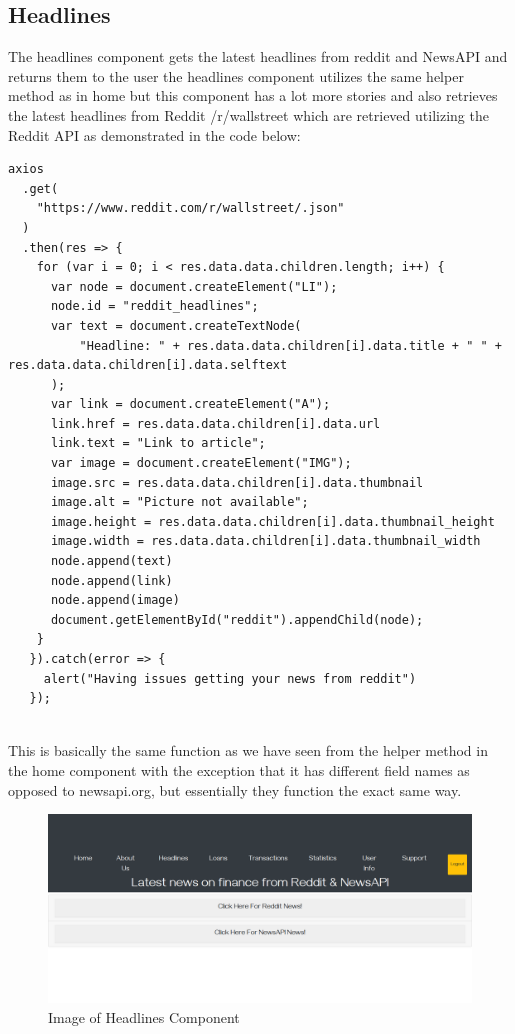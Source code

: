\subsection{Headlines}
The headlines component gets the latest headlines from reddit and NewsAPI and returns them to the user
the headlines component utilizes the same helper method as in home but this component has a lot more
stories and also retrieves the latest headlines from Reddit /r/wallstreet which are retrieved utilizing
the Reddit API as demonstrated in the code below:
\begin{verbatim}
axios
  .get(
    "https://www.reddit.com/r/wallstreet/.json"
  )
  .then(res => {
    for (var i = 0; i < res.data.data.children.length; i++) {
      var node = document.createElement("LI");
      node.id = "reddit_headlines";
      var text = document.createTextNode(
          "Headline: " + res.data.data.children[i].data.title + " " + res.data.data.children[i].data.selftext
      );
      var link = document.createElement("A");
      link.href = res.data.data.children[i].data.url
      link.text = "Link to article";
      var image = document.createElement("IMG");
      image.src = res.data.data.children[i].data.thumbnail
      image.alt = "Picture not available";
      image.height = res.data.data.children[i].data.thumbnail_height
      image.width = res.data.data.children[i].data.thumbnail_width
      node.append(text)
      node.append(link)
      node.append(image)
      document.getElementById("reddit").appendChild(node);
    }
   }).catch(error => {
     alert("Having issues getting your news from reddit")
   });
\end{verbatim}
\\
This is basically the same function as we have seen from the helper method in the home component with the
exception that it has different field names as opposed to newsapi.org, but essentially they function the
exact same way.
\begin{figure}[H]
\includegraphics[width=\textwidth]{img/headlinescomponent.png}
\caption{Image of Headlines Component}
\label{fig:Image of headlines component}
\end{figure}
